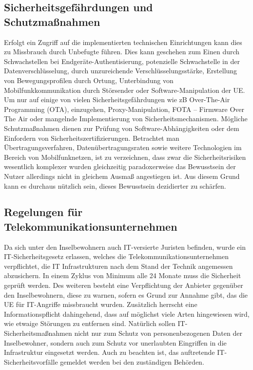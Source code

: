 \subsection{Sicherheitsgefährdungen und Schutzmaßnahmen}
Erfolgt ein Zugriff auf die implementierten technischen Einrichtungen kann dies zu Missbrauch durch Unbefugte führen. Dies kann geschehen zum Einen durch Schwachstellen bei Endgeräte-Authentisierung, potenzielle Schwachstelle in der Datenverschlüsselung, durch unzureichende Verschlüsselungsstärke, Erstellung von Bewegungsprofilen durch Ortung, Unterbindung von Mobilfunkkommunikation durch Störsender oder Software-Manipulation der UE. Um nur auf einige von vielen Sicherheitsgefährdungen wie zB Over-The-Air Programming (OTA), einzugehen, Proxy-Manipulation, FOTA – Firmware Over The Air oder mangelnde Implementierung von Sicherheitsmechanismen. Mögliche Schutzmaßnahmen dienen zur Prüfung von Software-Abhängigkeiten oder dem Einfordern von Sicherheitszertifizierungen. 
Betrachtet man Übertragungsverfahren, Datenübertragungsraten sowie weitere Technologien im Bereich von Mobilfunknetzen, ist zu verzeichnen, dass zwar die Sicherheitsrisiken wesentlich komplexer wurden gleichzeitig paradoxerweise das Bewusstsein der Nutzer allerdings nicht in gleichem Ausmaß angestiegen ist. Aus diesem Grund kann es durchaus nützlich sein, dieses Bewusstsein dezidierter zu schärfen\cite{Ger08}.

\subsection{Regelungen für Telekommunikationsunternehmen}

Da sich unter den Inselbewohnern auch IT-versierte Juristen befinden, wurde ein IT-Sicherheitsgesetz erlassen, welches die Telekommunikationsunternehmen verpflichtet, die IT Infrastrukturen nach dem Stand der Technik angemessen abzusichern. In einem Zyklus von Minimum alle 24 Monate muss die Sicherheit geprüft werden.
Des weiteren besteht eine Verpflichtung der Anbieter gegenüber den Inselbewohnern, diese zu warnen, sofern es Grund zur Annahme gibt, das die UE für IT-Angriffe missbraucht wurden. Zusätzlich herrscht eine Informationspflicht dahingehend, dass auf möglichst viele Arten hingewiesen wird, wie etwaige Störungen zu entfernen sind.
Natürlich sollen IT-Sicherheitsmaßnahmen nicht nur zum Schutz von personenbezogenen Daten der Inselbewohner, sondern auch zum Schutz vor unerlaubten Eingriffen in die Infrastruktur eingesetzt werden.
Auch zu beachten ist, das auftretende IT-Sicherheitsvorfälle gemeldet werden bei den zuständigen Behörden.\cite{BSI17}  